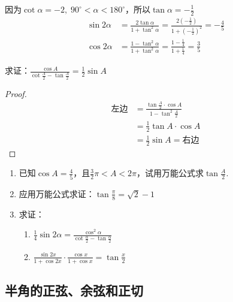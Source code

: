 \begin{solution}
因为$\cot\alpha=-2,\; 90^{\circ}<\alpha<180^{\circ}$，所以$\tan\alpha=-\frac{1}{2}$
\[\begin{split}
    \sin2\alpha&=\frac{2\tan\alpha}{1+\tan^2\alpha}=\frac{2\left(-\frac{1}{2}\right)}{1+\left(-\frac{1}{2}\right)^2}=-\frac{4}{5} \\
    \cos2\alpha&=\frac{1-\tan^2\alpha}{1+\tan^2\alpha}=\frac{1-\frac{1}{4}}{1+\frac{1}{4}}=\frac{3}{5}
\end{split}  \]
\end{solution}



\begin{example}
    求证：$\frac{\cos A}{\cot \frac{A}{2}-\tan \frac{A}{2}}=\frac{1}{2}\sin A$
\end{example}

\begin{proof}
\[\begin{split}
\text{左边}&=\frac{\tan \frac{A}{2}\cdot \cos A}{1-\tan^2 \frac{A}{2}}\\
&=\frac{1}{2}\tan A\cdot \cos A\\
&=\frac{1}{2}\sin A=\text{右边}
  \end{split}\]  
\end{proof}

\begin{ex}
\begin{enumerate}
    \item 已知$\cos A=\frac{4}{5}$，且$\frac{3}{2}\pi<A<2\pi$，试用万能公式求$\tan\frac{A}{2}$.
    \item 应用万能公式求证：$\tan\frac{\pi}{8}=\sqrt{2}-1$
    \item 求证：
\begin{enumerate}
    \item $\frac{1}{4}\sin2\alpha=\frac{\cos^2\alpha    }{\cot\frac{\alpha}{2}-\tan\frac{\alpha}{2}}$
    \item $\frac{\sin 2x}{1+\cos2x}\cdot \frac{\cos x}{1+\cos x}=\tan\frac{x}{2}$
\end{enumerate}
\end{enumerate}
\end{ex}


\subsection{半角的正弦、余弦和正切}

